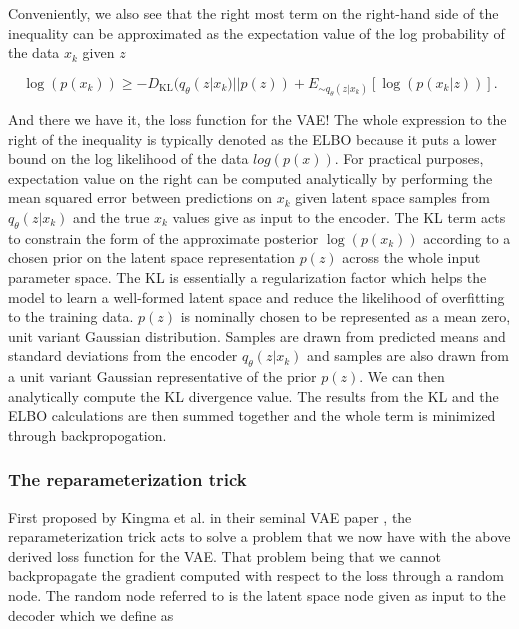 Conveniently, we also see that the right most term on the 
right-hand side of the inequality can be approximated as the 
expectation value of the log probability of the data $x_k$ 
given $z$

\begin{equation}
    \log(p(x_k)) \geq - D_{\textrm{KL}}(q_{\theta}(z|x_k) || p(z)) + 
    E_{\sim q_{\theta}(z|x_k)}[ \log({p(x_k|z)})].\label{eq:vae_loss}
\end{equation}

And there we have it, the loss function for the \ac{VAE}! 
The whole expression to the right of the inequality
is typically denoted as the \ac{ELBO} because it puts a 
lower bound on the log likelihood of the data $log(p(x))$. For 
practical purposes, expectation value on the right can be computed analytically 
by performing the mean squared error between predictions on $x_k$ given 
latent space samples from $q_{\theta}(z|x_k)$ and the true 
$x_k$ values give as input to the encoder. The KL term acts to constrain 
the form of the approximate posterior $\log(p(x_k))$ according to 
a chosen prior on the latent space representation $p(z)$ across the whole input 
parameter space. The KL is essentially a regularization factor which helps 
the model to learn a well-formed latent space and reduce the likelihood 
of overfitting to the training data. $p(z)$ is nominally chosen to be 
represented as a mean zero, unit variant Gaussian distribution. Samples 
are drawn from predicted means and standard deviations from the 
encoder $q_{\theta}(z|x_k)$ and samples are also drawn from a unit variant 
Gaussian representative of the prior $p(z)$. We can then 
analytically compute the KL divergence value. The results from the KL 
and the ELBO calculations are then summed together and the whole term is 
minimized through backpropogation.

%
%
\subsubsection{The reparameterization trick}

First proposed by Kingma et al. in their seminal \ac{VAE} 
paper \cite{1312.6114}, the reparameterization trick acts to 
solve a problem that we now have with the above derived loss 
function for the \ac{VAE}. That problem being that we cannot 
backpropagate the gradient computed with respect to the loss through 
a random node. The random node referred to is the latent space node 
given as input to the decoder which we define as 


